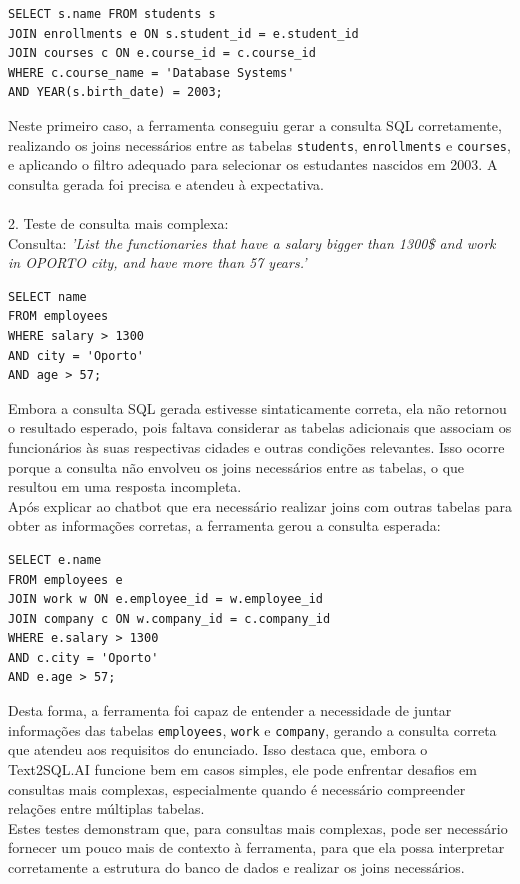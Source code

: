 \documentclass{article}
\begin{document}
\begin{lstlisting}
SELECT s.name FROM students s 
JOIN enrollments e ON s.student_id = e.student_id 
JOIN courses c ON e.course_id = c.course_id 
WHERE c.course_name = 'Database Systems' 
AND YEAR(s.birth_date) = 2003; 
\end{lstlisting}

Neste primeiro caso, a ferramenta conseguiu gerar a consulta SQL corretamente, realizando os joins necessários entre as tabelas \texttt{students}, \texttt{enrollments} e \texttt{courses}, e aplicando o filtro adequado para selecionar os estudantes nascidos em 2003. A consulta gerada foi precisa e atendeu à expectativa.
\\
\\
2. Teste de consulta mais complexa:\\
Consulta: \textit{'List the functionaries that have a salary bigger than 1300\$ and work in OPORTO city, and have more than 57 years.'}

\begin{lstlisting}
SELECT name
FROM employees
WHERE salary > 1300
AND city = 'Oporto'
AND age > 57;
\end{lstlisting}

Embora a consulta SQL gerada estivesse sintaticamente correta, ela não retornou o resultado esperado, pois faltava considerar as tabelas adicionais que associam os funcionários às suas respectivas cidades e outras condições relevantes. Isso ocorre porque a consulta não envolveu os joins necessários entre as tabelas, o que resultou em uma resposta incompleta.\\
\hspace*{1em} Após explicar ao chatbot que era necessário realizar joins com outras tabelas para obter as informações corretas, a ferramenta gerou a consulta esperada:

\begin{lstlisting}
SELECT e.name
FROM employees e
JOIN work w ON e.employee_id = w.employee_id
JOIN company c ON w.company_id = c.company_id
WHERE e.salary > 1300
AND c.city = 'Oporto'
AND e.age > 57;
\end{lstlisting}

Desta forma, a ferramenta foi capaz de entender a necessidade de juntar informações das tabelas \texttt{employees}, \texttt{work} e \texttt{company}, gerando a consulta correta que atendeu aos requisitos do enunciado. Isso destaca que, embora o Text2SQL.AI funcione bem em casos simples, ele pode enfrentar desafios em consultas mais complexas, especialmente quando é necessário compreender relações entre múltiplas tabelas.\\
\hspace*{1em} Estes testes demonstram que, para consultas mais complexas, pode ser necessário fornecer um pouco mais de contexto à ferramenta, para que ela possa interpretar corretamente a estrutura do banco de dados e realizar os joins necessários.
\end{document}
